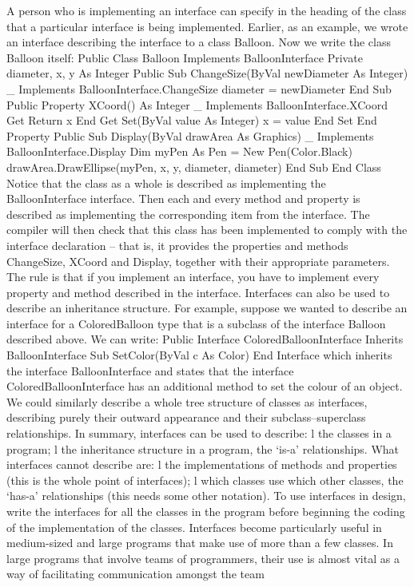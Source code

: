 A person who is implementing an interface can specify in the heading of the class 
that a particular interface is being implemented. Earlier, as an example, we wrote an interface describing the interface to a class Balloon. Now we write the class Balloon itself:
Public Class Balloon
	Implements BalloonInterface
	Private diameter, x, y As Integer
	Public Sub ChangeSize(ByVal newDiameter As Integer) _
		Implements BalloonInterface.ChangeSize
		diameter = newDiameter
	End Sub
	Public Property XCoord() As Integer _
		Implements BalloonInterface.XCoord
		Get
			Return x
		End Get
		Set(ByVal value As Integer)
			x = value
		End Set
	End Property
	Public Sub Display(ByVal drawArea As Graphics) _
		Implements BalloonInterface.Display
		Dim myPen As Pen = New Pen(Color.Black)
		drawArea.DrawEllipse(myPen, x, y, diameter, diameter)
	End Sub
End Class
Notice that the class as a whole is described as implementing the BalloonInterface interface. Then each and every method and property is described as implementing the corresponding item from the interface. The compiler will then check that this class has been implemented to comply with the interface declaration – that is, it provides the properties and methods ChangeSize, XCoord and Display, together with their appropriate parameters. The rule is that if you implement an interface, you have to implement every property and method described in the interface.
Interfaces can also be used to describe an inheritance structure. For example, suppose we wanted to describe an interface for a ColoredBalloon type that is a subclass of the interface Balloon described above. We can write:
Public Interface ColoredBalloonInterface
	Inherits BalloonInterface
	Sub SetColor(ByVal c As Color)
End Interface
which inherits the interface BalloonInterface and states that the interface ColoredBalloonInterface has an additional method to set the colour of an object. We could similarly describe a whole tree structure of classes as interfaces, describing purely their outward appearance and their subclass–superclass relationships.
In summary, interfaces can be used to describe:
l	the classes in a program;
l	the inheritance structure in a program, the ‘is-a’ relationships.
What interfaces cannot describe are:
l	the implementations of methods and properties (this is the whole point of interfaces);
l	which classes use which other classes, the ‘has-a’ relationships (this needs some other notation).
To use interfaces in design, write the interfaces for all the classes in the program before beginning the coding of the implementation of the classes.
Interfaces become particularly useful in medium-sized and large programs that make use of more than a few classes. In large programs that involve teams of programmers, their use is almost vital as a way of facilitating communication amongst the team 

